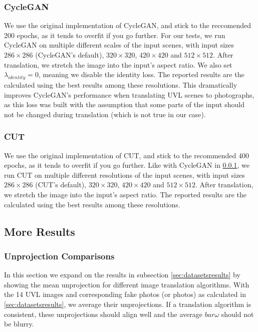 	\subsubsection{CycleGAN}
	\label{par:cyclegan}
	We use the original implementation of CycleGAN, and stick to the reccomended 200 epochs, as it tends to overfit if you go further. 
	For our tests, we run CycleGAN on multiple different scales of the input scenes, with input sizes $286\times286$ (CycleGAN's default), $320\times320$, $420\times420$ and $512\times512$. 
	After translation, we stretch the image into the input's aspect ratio.
	We also set $\lambda_{identity}=0$, meaning we disable the identity loss.
	The reported results are the calculated using the best results among these resolutions.
	This dramatically improves CycleGAN's performance when translating UVL scenes to photographs, as this loss was built with the assumption that some parts of the input should not be changed during translation (which is not true in our case).
	
	\subsubsection{CUT}
	\label{par:cut}
	We use the original implementation of CUT, and stick to the recommended 400 epochs, as it tends to overfit if you go further. 
	Like with CycleGAN in \ref{par:cyclegan}, we run CUT on multiple different resolutions of the input scenes, with input sizes $286\times286$ (CUT's default), $320\times320$, $420\times420$ and $512\times512$. 
	After translation, we stretch the image into the input's aspect ratio.
	The reported results are the calculated using the best results among these resolutions.

\subsection{More Results}

	\subsubsection{Unprojection Comparisons}

		In this section we expand on the results in subsection \ref{sec:datasetsresults} by showing the mean unprojection for different image translation algorithms. With the 14 UVL images and corresponding fake photos (or photos) as calculated in \ref{sec:datasetsresults}, we average their unprojections.
		If a translation algorithm is consistent, these unprojections should align well and the average $bar{\omega}$ should not be blurry.

